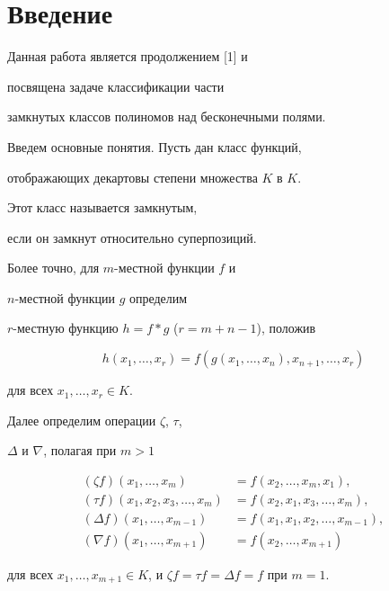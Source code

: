 \label{begin}





\section{Введение}





Данная работа является продолжением [1] и 


посвящена задаче классификации части


замкнутых классов полиномов над бесконечными полями.





Введем основные понятия. Пусть дан класс функций, 


отображающих декартовы степени множества $K$ в $K$.


Этот класс называется замкнутым,


если он замкнут относительно суперпозиций.


Более точно, для $m$-местной функции $f$ и 


$n$-местной функции $g$ определим


$r$-местную функцию $h=f*g$ ($r=m+n-1$), положив


$$


h(x_1,\dotsc,x_r)=f(g(x_1,\dotsc,x_n),x_{n+1},\dotsc,x_r)


$$


для всех $x_1,\dotsc,x_r\in K$. 


Далее определим операции $\zeta$, $\tau$, 


$\Delta$ и $\nabla$, полагая при $m>1$


\begin{align*}


(\zeta f)(x_1,\dotsc,x_m)&=f(x_2,\dotsc,x_m,x_1),\\


(\tau f)(x_1,x_2,x_3,\dotsc,x_m)&=f(x_2,x_1,x_3,\dotsc,x_m),\\


(\Delta f)(x_1,\dotsc,x_{m-1})&=f(x_1,x_1,x_2,\dotsc,x_{m-1}),\\


(\nabla f)(x_1,\dotsc,x_{m+1})&=f(x_2,\dotsc,x_{m+1})


\end{align*}


для всех $x_1,\dotsc,x_{m+1}\in K$, и $\zeta f=\tau f=\Delta f=f$ при $m=1$. 


